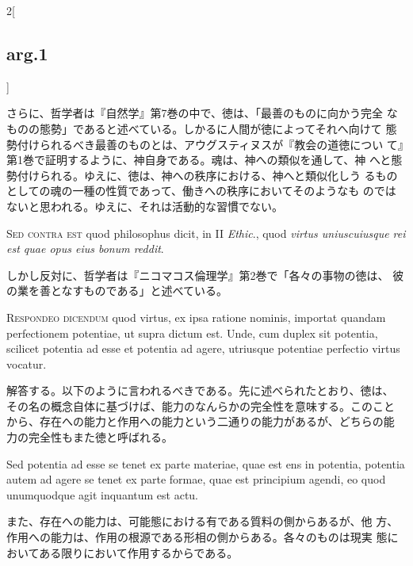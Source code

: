 \documentclass[paper=a4paper,fontsize=10pt,jafontsize=9pt,titlepage]{jlreq}
\begin{document}
\begin{paracol}{2}[\subsection{arg.1}]
\switchcolumn

さらに、哲学者は『自然学』第7巻の中で、徳は、「最善のものに向かう完全
なものの態勢」であると述べている。しかるに人間が徳によってそれへ向けて
態勢付けられるべき最善のものとは、アウグスティヌスが『教会の道徳につい
て』第1巻で証明するように、神自身である。魂は、神への類似を通して、神
へと態勢付けられる。ゆえに、徳は、神への秩序における、神へと類似化しう
るものとしての魂の一種の性質であって、働きへの秩序においてそのようなも
のではないと思われる。ゆえに、それは活動的な習慣でない。

\switchcolumn*[\subsection{s.c.}]

{\scshape Sed contra est} quod philosophus dicit, in II {\itshape
Ethic}., quod {\itshape virtus uniuscuiusque rei est quae opus eius
bonum reddit}.

\switchcolumn

しかし反対に、哲学者は『ニコマコス倫理学』第2巻で「各々の事物の徳は、
彼の業を善となすものである」と述べている。


{\scshape Respondeo dicendum} quod virtus, ex ipsa ratione nominis,
importat quandam perfectionem potentiae, ut supra dictum est. Unde,
cum duplex sit potentia, scilicet potentia ad esse et potentia ad
agere, utriusque potentiae perfectio virtus vocatur.

\switchcolumn

解答する。以下のように言われるべきである。先に述べられたとおり、徳は、
その名の概念自体に基づけば、能力のなんらかの完全性を意味する。このこと
から、存在への能力と作用への能力という二通りの能力があるが、どちらの能
力の完全性もまた徳と呼ばれる。

\switchcolumn*

Sed potentia ad esse se tenet ex parte materiae, quae est ens in
potentia, potentia autem ad agere se tenet ex parte formae, quae est
principium agendi, eo quod unumquodque agit inquantum est actu.

\switchcolumn

また、存在への能力は、可能態における有である質料の側からあるが、他
方、作用への能力は、作用の根源である形相の側からある。各々のものは現実
態においてある限りにおいて作用するからである。


\end{paracol}
\end{document}
